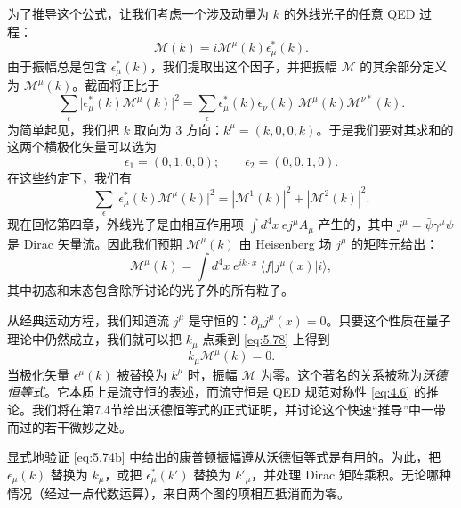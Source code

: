 为了推导这个公式，让我们考虑一个涉及动量为 $k$ 的外线光子的任意 QED 过程：
\begin{equation}
  \mathcal{M}(k) = i\mathcal{M}^{\mu}(k)\epsilon^{*}_\mu(k) .
  \label{eq:5.76}
\end{equation}
由于振幅总是包含 $\epsilon^{*}_\mu(k)$，我们提取出这个因子，并把振幅 $\mathcal{M}$ 的其余部分定义为 $\mathcal{M}^{\mu}(k)$。截面将正比于
\begin{equation}
  \sum_{\epsilon} \bigl| \epsilon^{*}_\mu(k)\mathcal{M}^{\mu}(k) \bigr|^2
    = \sum_{\epsilon} \epsilon^{*}_\mu(k)\epsilon_\nu(k)\,
      \mathcal{M}^{\mu}(k)\mathcal{M}^{\nu*}(k) .
\end{equation}
为简单起见，我们把 $k$ 取向为 3 方向：$k^\mu = (k, 0, 0, k)$。于是我们要对其求和的这两个横极化矢量可以选为
\begin{equation}
  \epsilon_1 = (0, 1, 0, 0);\qquad \epsilon_2 = (0, 0, 1, 0) .
\end{equation}
在这些约定下，我们有
\begin{equation}
  \sum_{\epsilon} \bigl| \epsilon^{*}_\mu(k)\mathcal{M}^{\mu}(k) \bigr|^2
    = |\mathcal{M}^1(k)|^2 + |\mathcal{M}^2(k)|^2 .
  \label{eq:5.77}
\end{equation}
现在回忆第四章，外线光子是由相互作用项 $\int d^4x\ e j^\mu A_\mu$ 产生的，其中 $j^\mu = \bar{\psi}\gamma^\mu\psi$ 是 Dirac 矢量流。因此我们预期 $\mathcal{M}^{\mu}(k)$ 由 Heisenberg 场 $j^\mu$ 的矩阵元给出：
\begin{equation}
  \mathcal{M}^{\mu}(k) = \int d^4x\ e^{ik\cdot x}\ \langle f|j^\mu(x)|i\rangle ,
  \label{eq:5.78}
\end{equation}
其中初态和末态包含除所讨论的光子外的所有粒子。

从经典运动方程，我们知道流 $j^\mu$ 是守恒的：$\partial_\mu j^\mu(x) = 0$。只要这个性质在量子理论中仍然成立，我们就可以把 $k_\mu$ 点乘到 \eqref{eq:5.78} 上得到
\begin{equation}
  k_\mu\mathcal{M}^{\mu}(k) = 0 .
  \label{eq:5.79}
\end{equation}
当极化矢量 $\epsilon^\mu(k)$ 被替换为 $k^\mu$ 时，振幅 $\mathcal{M}$ 为零。这个著名的关系被称为\emph{沃德恒等式}。它本质上是流守恒的表述，而流守恒是 QED 规范对称性 \eqref{eq:4.6} 的推论。我们将在第7.4节给出沃德恒等式的正式证明，并讨论这个快速``推导''中一带而过的若干微妙之处。

显式地验证 \eqref{eq:5.74b} 中给出的康普顿振幅遵从沃德恒等式是有用的。为此，把 $\epsilon_\mu(k)$ 替换为 $k_\mu$，或把 $\epsilon^{*}_\mu(k')$ 替换为 $k'_\mu$，并处理 Dirac 矩阵乘积。无论哪种情况（经过一点代数运算），来自两个图的项相互抵消而为零。

